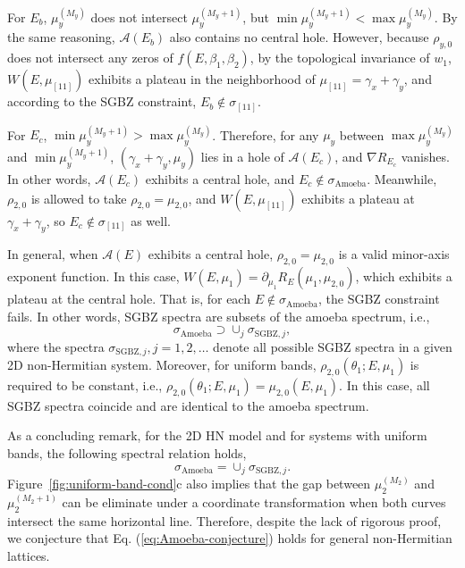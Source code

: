 \documentclass[pdflatex,sn-nature, iicol]{sn-jnl}%
\theoremstyle{thmstyleone}%
\theoremstyle{thmstyletwo}%
\theoremstyle{thmstylethree}%
\begin{document}
For $E_{b}$, $\mu_{y}^{(M_{y})}$ does not intersect $\mu_{y}^{(M_{y}+1)}$,
but $\min\mu_{y}^{(M_{y}+1)}<\max\mu_{y}^{(M_{y})}$. By the same
reasoning, $\mathcal{A}(E_{b})$ also contains no central hole. However,
because $\rho_{y,0}$ does not intersect any zeros of $f(E,\beta_{1},\beta_{2})$,
by the topological invariance of $w_{1}$, $W(E,\mu_{[11]})$ exhibits
a plateau in the neighborhood of $\mu_{[11]}=\gamma_{x}+\gamma_{y}$,
and according to the SGBZ constraint, $E_{b}\notin\sigma_{[11]}$.

For $E_{c}$, $\min\mu_{y}^{(M_{y}+1)}>\max\mu_{y}^{(M_{y})}$. Therefore,
for any $\mu_{y}$ between $\max\mu_{y}^{(M_{y})}$ and $\min\mu_{y}^{(M_{y}+1)}$,
$(\gamma_{x}+\gamma_{y},\mu_{y})$ lies in a hole of $\mathcal{A}(E_{c})$,
and $\nabla R_{E_{c}}$ vanishes. In other words, $\mathcal{A}(E_{c})$
exhibits a central hole, and $E_{c}\notin\sigma_{\text{Amoeba}}$.
Meanwhile, $\rho_{2,0}$ is allowed to take $\rho_{2,0}=\mu_{2,0}$,
and $W(E,\mu_{[11]})$ exhibits a plateau at $\gamma_{x}+\gamma_{y}$,
so $E_{c}\notin\sigma_{[11]}$ as well.

In general, when $\mathcal{A}(E)$ exhibits a central hole, $\rho_{2,0}=\mu_{2,0}$
is a valid minor-axis exponent function. In this case, $W(E,\mu_{1})=\partial_{\mu_{1}}R_{E}(\mu_{1},\mu_{2,0})$,
which exhibits a plateau at the central hole. That is, for each $E\notin\sigma_{\text{Amoeba}}$,
the SGBZ constraint fails. In other words, SGBZ spectra are subsets
of the amoeba spectrum, i.e., 
\begin{equation}
\sigma_{\text{Amoeba}}\supset\cup_{j}\sigma_{\text{SGBZ},j},
\end{equation}
where the spectra $\sigma_{\text{SGBZ},j},j=1,2,\dots$ denote all
possible SGBZ spectra in a given 2D non-Hermitian system. Moreover,
for uniform bands, $\rho_{2,0}(\theta_{1};E,\mu_{1})$ is required
to be constant, i.e., $\rho_{2,0}(\theta_{1};E,\mu_{1})=\mu_{2,0}(E,\mu_{1})$.
In this case, all SGBZ spectra coincide and are identical to the amoeba
spectrum.

As a concluding remark, for the 2D HN model and for systems with uniform
bands, the following spectral relation holds, 
\begin{equation}
\sigma_{\text{Amoeba}}=\cup_{j}\sigma_{\text{SGBZ},j}.\label{eq:Amoeba-conjecture}
\end{equation}
Figure~\ref{fig:uniform-band-cond}c also implies that the gap between $\mu_{2}^{(M_{2})}$ and
$\mu_{2}^{(M_{2}+1)}$ can be eliminate under a coordinate transformation
when both curves intersect the same horizontal line. Therefore, despite
the lack of rigorous proof, we conjecture that Eq. (\ref{eq:Amoeba-conjecture})
holds for general non-Hermitian lattices.
\end{document}
